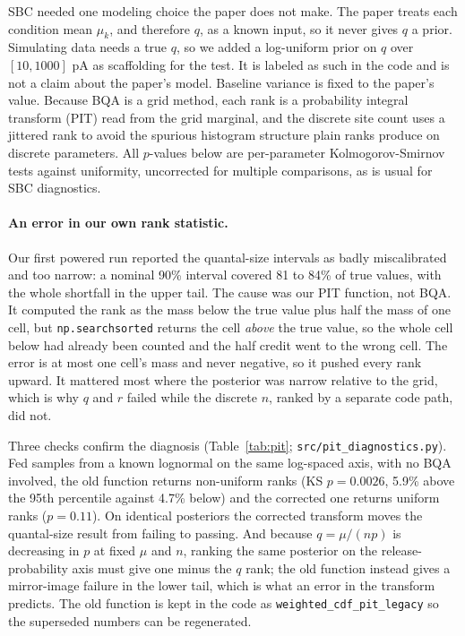 \documentclass[a4paper, oneside, 10pt]{article}
\begin{document}
SBC needed one modeling choice the paper does not make. The paper treats each condition mean \(\mu_k\), and therefore \(q\), as a known input, so it never gives \(q\) a prior. Simulating data needs a true \(q\), so we added a log-uniform prior on \(q\) over \([10, 1000]\) pA as scaffolding for the test. It is labeled as such in the code and is not a claim about the paper's model. Baseline variance is fixed to the paper's value. Because BQA is a grid method, each rank is a probability integral transform (PIT) read from the grid marginal, and the discrete site count uses a jittered rank to avoid the spurious histogram structure plain ranks produce on discrete parameters\supercite{sailynoja2022}. All \(p\)-values below are per-parameter Kolmogorov-Smirnov tests against uniformity, uncorrected for multiple comparisons, as is usual for SBC diagnostics.

\paragraph{An error in our own rank statistic.}
Our first powered run reported the quantal-size intervals as badly miscalibrated and too narrow: a nominal 90\% interval covered 81 to 84\% of true values, with the whole shortfall in the upper tail. The cause was our PIT function, not BQA. It computed the rank as the mass below the true value plus half the mass of one cell, but \texttt{np.searchsorted} returns the cell \emph{above} the true value, so the whole cell below had already been counted and the half credit went to the wrong cell. The error is at most one cell's mass and never negative, so it pushed every rank upward. It mattered most where the posterior was narrow relative to the grid, which is why \(q\) and \(r\) failed while the discrete \(n\), ranked by a separate code path, did not.

Three checks confirm the diagnosis (Table~\ref{tab:pit}; \texttt{src/pit\_diagnostics.py}). Fed samples from a known lognormal on the same log-spaced axis, with no BQA involved, the old function returns non-uniform ranks (KS \(p = 0.0026\), 5.9\% above the 95th percentile against 4.7\% below) and the corrected one returns uniform ranks (\(p = 0.11\)). On identical posteriors the corrected transform moves the quantal-size result from failing to passing. And because \(q = \mu/(np)\) is decreasing in \(p\) at fixed \(\mu\) and \(n\), ranking the same posterior on the release-probability axis must give one minus the \(q\) rank; the old function instead gives a mirror-image failure in the lower tail, which is what an error in the transform predicts. The old function is kept in the code as \texttt{weighted\_cdf\_pit\_legacy} so the superseded numbers can be regenerated.
\end{document}
